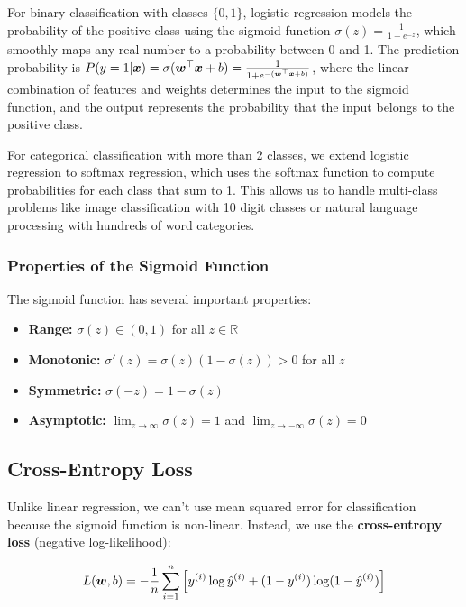 For binary classification with classes $\{0, 1\}$, logistic regression models the probability of the positive class using the sigmoid function $\sigma(z) = \frac{1}{1 + e^{-z}}$, which smoothly maps any real number to a probability between 0 and 1. The prediction probability is $P(y=1|\boldsymbol{x}) = \sigma(\boldsymbol{w}^\top \boldsymbol{x} + b) = \frac{1}{1 + e^{-(\boldsymbol{w}^\top \boldsymbol{x} + b)}}$, where the linear combination of features and weights determines the input to the sigmoid function, and the output represents the probability that the input belongs to the positive class.

\begin{remark}
For categorical classification with more than 2 classes, we extend logistic regression to softmax regression, which uses the softmax function to compute probabilities for each class that sum to 1. This allows us to handle multi-class problems like image classification with 10 digit classes or natural language processing with hundreds of word categories.
\end{remark}

\subsubsection{Properties of the Sigmoid Function}

The sigmoid function has several important properties:
\begin{itemize}
    \item \textbf{Range:} $\sigma(z) \in (0, 1)$ for all $z \in \mathbb{R}$
    \item \textbf{Monotonic:} $\sigma'(z) = \sigma(z)(1-\sigma(z)) > 0$ for all $z$
    \item \textbf{Symmetric:} $\sigma(-z) = 1 - \sigma(z)$
    \item \textbf{Asymptotic:} $\lim_{z \to \infty} \sigma(z) = 1$ and $\lim_{z \to -\infty} \sigma(z) = 0$
\end{itemize}

\subsection{Cross-Entropy Loss}

Unlike linear regression, we can't use mean squared error for classification because the sigmoid function is non-linear. Instead, we use the \textbf{cross-entropy loss} (negative log-likelihood):

\begin{equation}
L(\boldsymbol{w}, b) = -\frac{1}{n} \sum_{i=1}^{n} \left[y^{(i)} \log \hat{y}^{(i)} + (1-y^{(i)}) \log(1-\hat{y}^{(i)})\right]
\end{equation}

